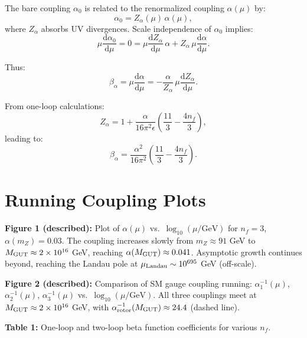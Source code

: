 \documentclass[11pt,a4paper]{article}
\numberwithin{equation}{section}
\theoremstyle{plain}
\theoremstyle{definition}
\theoremstyle{remark}
\newcommand{\dd}{\mathrm{d}}
\begin{document}
The bare coupling $\alpha_0$ is related to the renormalized coupling $\alpha(\mu)$ by:
\begin{equation}
\alpha_0 = Z_\alpha(\mu)\,\alpha(\mu),
\label{eq:alpha-bare}
\end{equation}
where $Z_\alpha$ absorbs UV divergences. Scale independence of $\alpha_0$ implies:
\begin{equation}
\mu\frac{\dd\alpha_0}{\dd\mu} = 0 = \mu\frac{\dd Z_\alpha}{\dd\mu}\,\alpha + Z_\alpha\,\mu\frac{\dd\alpha}{\dd\mu}.
\label{eq:bare-scale-indep}
\end{equation}

Thus:
\begin{equation}
\beta_\alpha = \mu\frac{\dd\alpha}{\dd\mu} = -\frac{\alpha}{Z_\alpha}\,\mu\frac{\dd Z_\alpha}{\dd\mu}.
\label{eq:beta-from-Z}
\end{equation}

From one-loop calculations:
\begin{equation}
Z_\alpha = 1 + \frac{\alpha}{16\pi^2\epsilon}\left(\frac{11}{3}-\frac{4n_f}{3}\right),
\label{eq:Z-alpha-1loop}
\end{equation}
leading to:
\begin{equation}
\beta_\alpha = \frac{\alpha^2}{16\pi^2}\left(\frac{11}{3}-\frac{4n_f}{3}\right).
\label{eq:beta-final}
\end{equation}

\section{Running Coupling Plots}\label{app:plots}

\textbf{Figure 1 (described):} Plot of $\alpha(\mu)$ vs.\ $\log_{10}(\mu/\text{GeV})$ for $n_f=3$, $\alpha(m_Z)=0.03$. The coupling increases slowly from $m_Z\approx 91$ GeV to $M_{\rm GUT}\approx 2\times 10^{16}$ GeV, reaching $\alpha(M_{\rm GUT})\approx 0.041$. Asymptotic growth continues beyond, reaching the Landau pole at $\mu_{\rm Landau}\sim 10^{695}$ GeV (off-scale).

\textbf{Figure 2 (described):} Comparison of SM gauge coupling running: $\alpha_1^{-1}(\mu)$, $\alpha_2^{-1}(\mu)$, $\alpha_3^{-1}(\mu)$ vs.\ $\log_{10}(\mu/\text{GeV})$. All three couplings meet at $M_{\rm GUT}\approx 2\times 10^{16}$ GeV, with $\alpha_{\rm rotor}^{-1}(M_{\rm GUT})\approx 24.4$ (dashed line).

\textbf{Table 1:} One-loop and two-loop beta function coefficients for various $n_f$.
\end{document}
